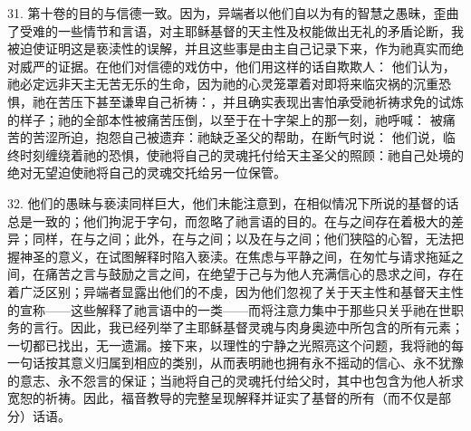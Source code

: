 31. 第十卷的目的与信德一致。因为，异端者以他们自以为有的智慧之愚昧，歪曲了受难的一些情节和言语，对主耶稣基督的天主性及权能做出无礼的矛盾论断，我被迫使证明这是亵渎性的误解，并且这些事是由主自己记录下来，作为祂真实而绝对威严的证据。在他们对信德的戏仿中，他们用这样的话自欺欺人： 他们认为，祂必定远非天主无苦无乐的生命，因为祂的心灵笼罩着对即将来临灾祸的沉重恐惧，祂在苦压下甚至谦卑自己祈祷：，并且确实表现出害怕承受祂祈祷求免的试炼的样子；祂的全部本性被痛苦压倒，以至于在十字架上的那一刻，祂呼喊： 被痛苦的苦涩所迫，抱怨自己被遗弃：祂缺乏圣父的帮助，在断气时说： 他们说，临终时刻缠绕着祂的恐惧，使祂将自己的灵魂托付给天主圣父的照顾：祂自己处境的绝对无望迫使祂将自己的灵魂交托给另一位保管。\par

32. 他们的愚昧与亵渎同样巨大，他们未能注意到，在相似情况下所说的基督的话总是一致的；他们拘泥于字句，而忽略了祂言语的目的。在与之间存在着极大的差异；同样，在与之间；此外，在与之间；以及在与之间；他们狭隘的心智，无法把握神圣的意义，在试图解释时陷入亵渎。在焦虑与平静之间，在匆忙与请求拖延之间，在痛苦之言与鼓励之言之间，在绝望于己与为他人充满信心的恳求之间，存在着广泛区别；异端者显露出他们的不虔，因为他们忽视了关于天主性和基督天主性的宣称——这些解释了祂言语中的一类——而将注意力集中于那些只关乎祂在世职务的言行。因此，我已经列举了主耶稣基督灵魂与肉身奥迹中所包含的所有元素；一切都已找出，无一遗漏。接下来，以理性的宁静之光照亮这个问题，我将祂的每一句话按其意义归属到相应的类别，从而表明祂也拥有永不摇动的信心、永不犹豫的意志、永不怨言的保证；当祂将自己的灵魂托付给父时，其中也包含为他人祈求宽恕的祈祷。因此，福音教导的完整呈现解释并证实了基督的所有（而不仅是部分）话语。\par

